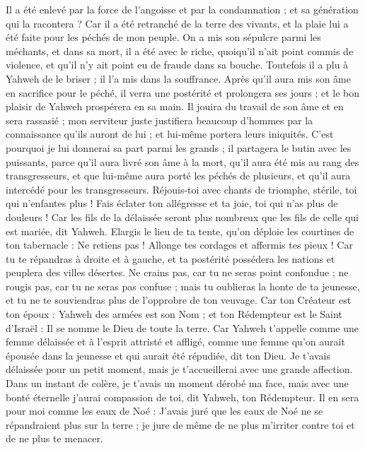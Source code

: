 \begin{multicols}{2}
Il a été enlevé par la force de l'angoisse et par la condamnation ; et sa génération qui la racontera ? Car il a été retranché de la terre des vivants, et la plaie lui a été faite pour les péchés de mon peuple.
On a mis son sépulcre parmi les méchants, et dans sa mort, il a été avec le riche, quoiqu'il n'ait point commis de violence, et qu'il n'y ait point eu de fraude dans sa bouche.
Toutefois il a plu à Yahweh de le briser ; il l'a mis dans la souffrance. Après qu'il aura mis son âme en sacrifice pour le péché, il verra une postérité et prolongera ses jours ; et le bon plaisir de Yahweh prospérera en sa main.
Il jouira du travail de son âme et en sera rassasié ; mon serviteur juste justifiera beaucoup d'hommes par la connaissance qu'ils auront de lui ; et lui-même portera leurs iniquités.
C'est pourquoi je lui donnerai sa part parmi les grands ; il partagera le butin avec les puissants, parce qu'il aura livré son âme à la mort, qu'il aura été mis au rang des transgresseurs, et que lui-même aura porté les péchés de plusieurs, et qu'il aura intercédé pour les transgresseurs.
\VerseOne{}Réjouis-toi avec chants de triomphe, stérile, toi qui n'enfantes plus ! Fais éclater ton allégresse et ta joie, toi qui n'as plus de douleurs ! Car les fils de la délaissée seront plus nombreux que les fils de celle qui est mariée, dit Yahweh.
Elargis le lieu de ta tente, qu'on déploie les courtines de ton tabernacle : Ne retiens pas ! Allonge tes cordages et affermis tes pieux !
Car tu te répandras à droite et à gauche, et ta postérité possédera les nations et peuplera des villes désertes.
Ne crains pas, car tu ne seras point confondue ; ne rougis pas, car tu ne seras pas confuse ; mais tu oublieras la honte de ta jeunesse, et tu ne te souviendras plus de l'opprobre de ton veuvage.
Car ton Créateur est ton époux : Yahweh des armées est son Nom ; et ton Rédempteur est le Saint d'Israël : Il se nomme le Dieu de toute la terre.
Car Yahweh t'appelle comme une femme délaissée et à l'esprit attristé et affligé, comme une femme qu'on aurait épousée dans la jeunesse et qui aurait été répudiée, dit ton Dieu.
Je t'avais délaissée pour un petit moment, mais je t'accueillerai avec une grande affection.
Dans un instant de colère, je t'avais un moment dérobé ma face, mais avec une bonté éternelle j'aurai compassion de toi, dit Yahweh, ton Rédempteur.
Il en sera pour moi comme les eaux de Noé : J'avais juré que les eaux de Noé ne se répandraient plus sur la terre ; je jure de même de ne plus m'irriter contre toi et de ne plus te menacer.

\end{multicols}
